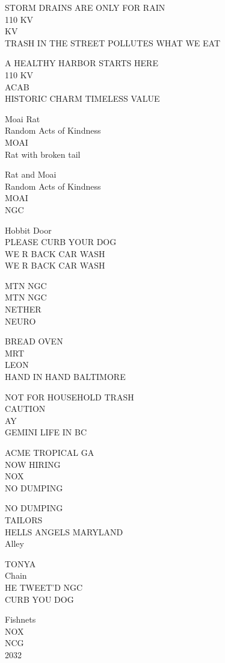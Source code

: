 \documentclass[10pt,letterpaper]{article}
\begin{document}
STORM DRAINS ARE ONLY FOR RAIN\\
110 KV\\
KV\\
TRASH IN THE STREET POLLUTES WHAT WE EAT

A HEALTHY HARBOR STARTS HERE\\
110 KV\\
ACAB\\
HISTORIC CHARM TIMELESS VALUE

Moai Rat\\
Random Acts of Kindness\\
MOAI\\
Rat with broken tail

Rat and Moai\\
Random Acts of Kindness\\
MOAI\\
NGC

Hobbit Door\\
PLEASE CURB YOUR DOG\\
WE R BACK CAR WASH\\
WE R BACK CAR WASH

MTN NGC\\
MTN NGC\\
NETHER\\
NEURO

BREAD OVEN\\
MRT\\
LEON\\
HAND IN HAND BALTIMORE

NOT FOR HOUSEHOLD TRASH\\
CAUTION\\
AY\\
GEMINI LIFE IN BC

ACME TROPICAL GA\\
NOW HIRING\\
NOX\\
NO DUMPING

NO DUMPING\\
TAILORS\\
HELLS ANGELS MARYLAND\\
Alley

TONYA\\
Chain\\
HE TWEET'D NGC\\
CURB YOU DOG

Fishnets\\
NOX\\
NCG\\
2032
\end{document}
